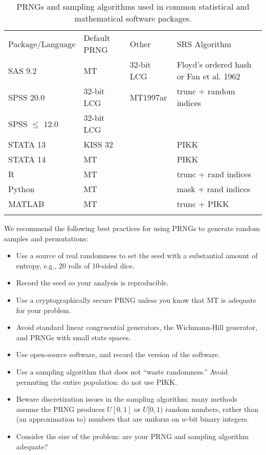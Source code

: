 \documentclass[graybox]{svmult}
\begin{document}
\begin{table}
\caption{PRNGs and sampling algorithms used in common statistical and mathematical software packages.}
\label{tab:software}      
\begin{tabular}[h]{p{2.5cm}p{2.4cm}p{2.5cm}p{4cm}}
\hline\noalign{\smallskip}
Package/Language & Default PRNG & Other & SRS Algorithm  \\
\noalign{\smallskip}\svhline\noalign{\smallskip}
SAS 9.2              & MT         	& 32-bit LCG & Floyd's ordered hash or Fan et al. 1962 \\
SPSS 20.0          & 32-bit LCG  & MT1997ar  & trunc + random indices \\
SPSS $\le$ 12.0 & 32-bit LCG  &         &                \\
STATA 13            & KISS 32      &         & PIKK           \\
STATA 14            & MT              &         & PIKK           \\
R                         & MT              &         & trunc + rand indices \\
Python                 & MT             &         & mask + rand indices  \\
MATLAB              & MT             &         & trunc + PIKK         \\
\noalign{\smallskip}\hline\noalign{\smallskip}
\end{tabular}
\end{table}


We recommend the following best practices for using PRNGs to generate random samples and permutations:
\begin{itemize}
\item Use a source of real randomness to set the seed with a substantial amount of entropy, e.g., 20 rolls of 10-sided dice.
\item Record the seed so your analysis is reproducible.
\item Use a cryptographically secure PRNG unless you know that MT is adequate for your problem.
\item Avoid standard linear congruential generators, the Wichmann-Hill generator, and PRNGs with small state spaces.
\item Use open-source software, and record the version of the software.
\item Use a sampling algorithm that does not ``waste randomness.'' Avoid permuting the entire population: do not use PIKK.
\item Beware discretization issues in the sampling algorithm; many methods assume the PRNG produces $U[0,1]$ or $U[0,1)$ random numbers, rather than (an approximation to) numbers that are uniform on $w$-bit binary integers.
\item Consider the size of the problem: are your PRNG and sampling algorithm adequate?
\end{itemize}
\end{document}
